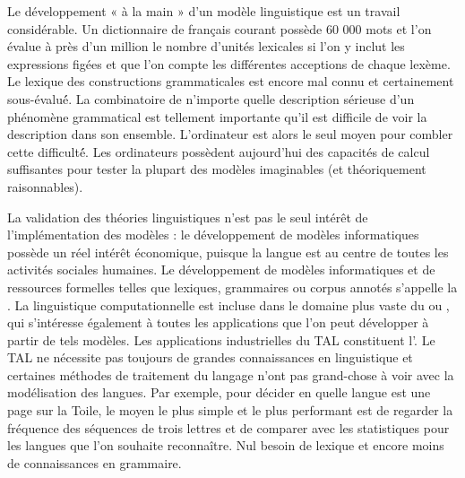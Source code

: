 Le développement « à la main » d’un modèle linguistique est un travail considérable. Un dictionnaire de français courant possède 60 000 mots et l’on évalue à près d’un million le nombre d’unités lexicales si l’on y inclut les expressions figées et que l’on compte les différentes acceptions de chaque lexème. Le lexique des constructions grammaticales est encore mal connu et certainement sous-évalué́. La combinatoire de n’importe quelle description sérieuse d’un phénomène grammatical est tellement importante qu’il est difficile de voir la description dans son ensemble. L’ordinateur est alors le seul moyen pour combler cette difficulté́. Les ordinateurs possèdent aujourd’hui des capacités de calcul suffisantes pour tester la plupart des modèles imaginables (et théoriquement raisonnables). 

La validation des théories linguistiques n’est pas le seul intérêt de l’implémentation des modèles : le développement de modèles informatiques possède un réel intérêt économique, puisque la langue est au centre de toutes les activités sociales humaines. Le développement de modèles informatiques et de ressources formelles telles que lexiques, grammaires ou corpus annotés s’appelle la . La linguistique computationnelle est incluse dans le domaine plus vaste du  ou , qui s’intéresse également à toutes les applications que l’on peut développer à partir de tels modèles. Les applications industrielles du TAL constituent l’. 
Le TAL ne nécessite pas toujours de grandes connaissances en linguistique et certaines méthodes de traitement du langage n’ont pas grand-chose à voir avec la modélisation des langues. Par exemple, pour décider en quelle langue est une page sur la Toile, le moyen le plus simple et le plus performant est de regarder la fréquence des séquences de trois lettres et de comparer avec les statistiques pour les langues que l’on souhaite reconnaître. Nul besoin de lexique et encore moins de connaissances en grammaire. 

